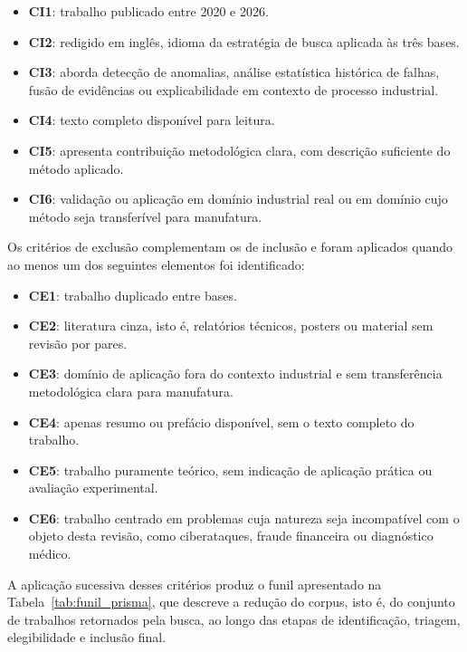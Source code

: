\begin{itemize}
    \item \textbf{CI1}: trabalho publicado entre 2020 e 2026.
    \item \textbf{CI2}: redigido em inglês, idioma da estratégia de busca aplicada às três bases.
    \item \textbf{CI3}: aborda detecção de anomalias, análise estatística histórica de falhas, fusão de evidências ou explicabilidade em contexto de processo industrial.
    \item \textbf{CI4}: texto completo disponível para leitura.
    \item \textbf{CI5}: apresenta contribuição metodológica clara, com descrição suficiente do método aplicado.
    \item \textbf{CI6}: validação ou aplicação em domínio industrial real ou em domínio cujo método seja transferível para manufatura.
\end{itemize}

Os critérios de exclusão complementam os de inclusão e foram aplicados quando ao menos um dos seguintes elementos foi identificado:

\begin{itemize}
    \item \textbf{CE1}: trabalho duplicado entre bases.
    \item \textbf{CE2}: literatura cinza, isto é, relatórios técnicos, posters ou material sem revisão por pares.
    \item \textbf{CE3}: domínio de aplicação fora do contexto industrial e sem transferência metodológica clara para manufatura.
    \item \textbf{CE4}: apenas resumo ou prefácio disponível, sem o texto completo do trabalho.
    \item \textbf{CE5}: trabalho puramente teórico, sem indicação de aplicação prática ou avaliação experimental.
    \item \textbf{CE6}: trabalho centrado em problemas cuja natureza seja incompatível com o objeto desta revisão, como ciberataques, fraude financeira ou diagnóstico médico.
\end{itemize}

A aplicação sucessiva desses critérios produz o funil  apresentado na Tabela~\ref{tab:funil_prisma}, que descreve a redução do corpus, isto é, do conjunto de trabalhos retornados pela busca, ao longo das etapas de identificação, triagem, elegibilidade e inclusão final.

